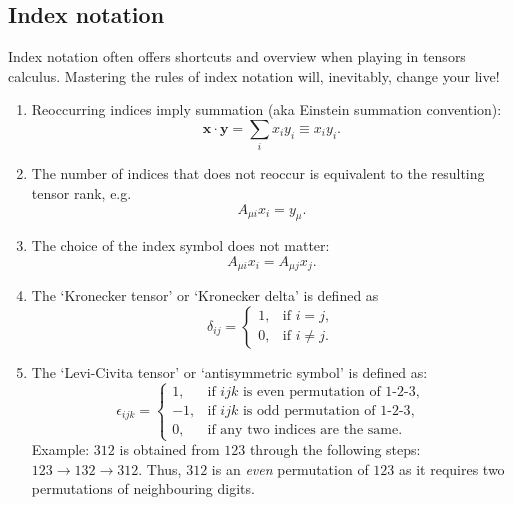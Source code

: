 \subsection{Index notation}

Index notation often offers shortcuts and overview when playing in tensors calculus. Mastering the rules of index notation will, inevitably, change your live!
\begin{enumerate}
    \item Reoccurring indices imply summation (aka Einstein summation convention):
    \begin{equation}
        \boldsymbol{x} \cdot \boldsymbol{y}=\sum_i x_i y_i \equiv x_i y_i.
    \end{equation}
    \item The number of indices that does not reoccur is equivalent to the resulting tensor rank, e.g.
    \begin{equation}
           A_{\mu i} x_i =  y_\mu.
    \end{equation}
    \item The choice of the index symbol does not matter:
        \begin{equation}
            A_{\mu i}  x_i = A_{\mu j} x_j.
        \end{equation}

    \item The `Kronecker tensor' or  `Kronecker delta' is defined as
    \begin{equation}
        \delta_{ij} =
    \begin{cases}
            1, &         \text{if } i=j,\\
            0, &         \text{if } i\neq j.
    \end{cases} 
    \end{equation}
    \item The `Levi-Civita tensor' or `antisymmetric symbol' is defined as:
    \begin{equation}
        \epsilon_{ijk} =
    \begin{cases}
            1, &        \text{if } ijk \text{ is even permutation of 1-2-3},\\
            -1, &       \text{if } ijk \text{ is odd permutation of 1-2-3},\\
            0 , &       \text{if any two indices are the same}.  
    \end{cases} 
    \end{equation}
    Example: $312$ is obtained from $123$ through the following steps: $123 \rightarrow 132 \rightarrow 312$. Thus, $312$ is an \emph{even} permutation of $123$ as it requires two permutations of neighbouring digits.
\end{enumerate}



